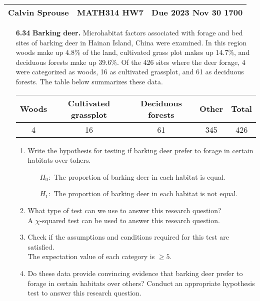 \documentclass[a4paper, 12pt]{../../config/homework}
\begin{document}
\noindent
\begin{tabularx}{\textwidth}{>{\centering\arraybackslash}X>{\centering\arraybackslash}X>{\centering\arraybackslash}X}
\toprule
Calvin Sprouse & MATH314 HW7 & Due 2023 Nov 30 1700\\
\midrule
\end{tabularx}

\begin{enumerate}
\item[\textbf{6.34}] \textbf{Barking deer.} Microhabitat factors associated with forage and bed sites of barking deer in Hainan Island, China were examined. In this region woods make up 4.8\% of the land, cultivated grass plot makes up 14.7\%, and deciduous forests make up 39.6\%. Of the 426 sites where the deer forage, 4 were categorized as woods, 16 as cultivated grassplot, and 61 as deciduous forests. The table below summarizes these data.
\begin{table}[h]
    \centering
    \begin{tabular}{ccccc}
    Woods & Cultivated grassplot & Deciduous forests & Other & Total \\ \midrule
    4 & 16 & 61 & 345 & 426
    \end{tabular}
\end{table}
\begin{enumerate}[label=(\alph*)]
\item Write the hypothesis for testing if barking deer prefer to forage in certain habitats over tohers.
\begin{enumerate}
    \item[\(H_0 : \)] The proportion of barking deer in each habitat is equal.
    \item[\(H_1 : \)] The proportion of barking deer in each habitat is not equal.
\end{enumerate}
\item What type of test can we use to answer this research question?
\\A \(\chi \)-squared test can be used to answer this research question.
\item Check if the assumptions and conditions required for this test are satisfied.
\\The expectation value of each category is \(\ge 5\).
\pagebreak
\item Do these data provide convincing evidence that barking deer prefer to forage in certain habitats over others? Conduct an appropriate hypothesis test to answer this research question.

\end{enumerate}
\end{enumerate}
\end{document}
